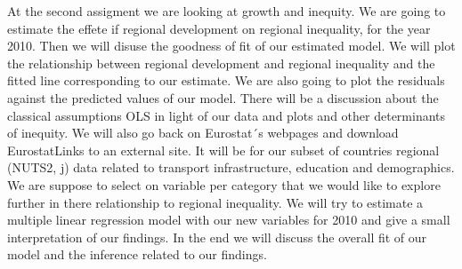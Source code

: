 \documentclass[
]{article}
\begin{document}
At the second assigment we are looking at growth and inequity. We are
going to estimate the effete if regional development on regional
inequality, for the year 2010. Then we will disuse the goodness of fit
of our estimated model. We will plot the relationship between regional
development and regional inequality and the fitted line corresponding to
our estimate. We are also going to plot the residuals against the
predicted values of our model. There will be a discussion about the
classical assumptions OLS in light of our data and plots and other
determinants of inequity. We will also go back on Eurostat´s webpages
and download EurostatLinks to an external site. It will be for our
subset of countries regional (NUTS2, j) data related to transport
infrastructure, education and demographics. We are suppose to select on
variable per category that we would like to explore further in there
relationship to regional inequality. We will try to estimate a multiple
linear regression model with our new variables for 2010 and give a small
interpretation of our findings. In the end we will discuss the overall
fit of our model and the inference related to our findings.
\end{document}
